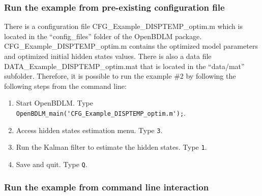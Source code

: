 \subsubsection{Run the example from pre-existing configuration file}
\label{SS:LoadConfigFileEx2}
There is a configuration file CFG\_Example\_DISPTEMP\_optim.m which is located in the ``config\_files'' folder of the OpenBDLM package.
CFG\_Example\_DISPTEMP\_optim.m contains the optimized model parameters and optimized initial hidden states values.
There is also a data file DATA\_Example\_DISPTEMP\_optim.mat that is located in the ``data/mat'' subfolder.
Therefore, it is possible to run the example \#2 by following the following steps from the \MATLAB{} command line:
\begin{enumerate}
\item Start OpenBDLM. Type \colorbox{light-gray}{\lstinline[basicstyle = \mlttfamily \small, backgroundcolor = \color{light-gray}]!OpenBDLM_main('CFG_Example_DISPTEMP_optim.m');!}.
\item Access hidden states estimation menu. Type \colorbox{light-gray}{\lstinline[basicstyle = \mlttfamily \small, backgroundcolor = \color{light-gray}]!3!}.
\item Run the Kalman filter to estimate the hidden states. Type \colorbox{light-gray}{\lstinline[basicstyle = \mlttfamily \small, backgroundcolor = \color{light-gray}]!1!}.
\item Save and quit. Type \colorbox{light-gray}{\lstinline[basicstyle = \mlttfamily \small, backgroundcolor = \color{light-gray}]!Q!}.
\end{enumerate}


\subsubsection{Run the example from command line interaction}

